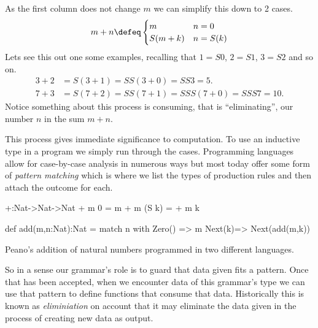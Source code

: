 As the first column does not change $m$ we can simplify this down to 2 cases.
\begin{align*}
    m+n \defeq \begin{cases} m & n=0\\ S(m+k) & n=S(k)\end{cases}
\end{align*}
Lets see this out one some examples, recalling that $1=S0$, $2=S1$, $3=S2$ and so on.
\begin{align*}
    3+2 & = S(3+1)= SS(3+0) = SS3=5.\\
    7+3 & = S(7+2) = SS(7+1) = SSS(7+0)=SSS7=10.
\end{align*}
Notice something about this process is consuming, that is ``eliminating'',
our number $n$ in the sum $m+n$.  

This process gives immediate significance to computation.
To use an inductive type in a program we simply run through the cases.
Programming languages allow for case-by-case analysis in numerous ways 
but most today offer some form of \emph{pattern matching} which is 
where we list the types of production rules and then attach the outcome 
for each.
\begin{lstfloat}
\begin{center}
\begin{minipage}{0.4\textwidth}
\begin{Fcode}[]
+:Nat->Nat->Nat
+ m  0    = m
+ m (S k) = + m k
\end{Fcode}
\end{minipage}
\hfill
\begin{minipage}{0.59\textwidth}
\begin{Pcode}[]
def add(m,n:Nat):Nat =
  match n with 
    Zero() => m
    Next(k)=> Next(add(m,k))
\end{Pcode}
\end{minipage}
\end{center}
\caption{Peano's addition of natural numbers programmed in two different languages.}
\label{lst:peano}
\end{lstfloat}


So in a sense our grammar's role is to guard that data given fits 
a pattern.  Once that has been accepted, when we encounter data 
of this grammar's type we can use that pattern to define functions 
that consume that data.  Historically this is known as \emph{eliminiation}
on account that it may eliminate the data given in the process of 
creating new data as output.

